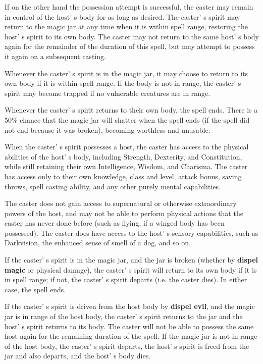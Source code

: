\documentclass[a4paper,twoside,openany,10pt]{book}
\begin{document}
\begin{multicols}{2}
If on the other hand the possession attempt is successful, the caster may remain in control of the host' s body for as long as desired. The caster' s spirit may return to the magic jar at any time when it is within spell range, restoring the host' s spirit to its own body. The caster may not return to the same host' s body again for the remainder of the duration of this spell, but may attempt to possess it again on a subsequent casting.

Whenever the caster' s spirit is in the magic jar, it may choose to return to its own body if it is within spell range. If the body is not in range, the caster' s spirit may become trapped if no vulnerable creatures are in range.

Whenever the caster' s spirit returns to their own body, the spell ends. There is a 50\% chance that the magic jar will shatter when the spell ends (if the spell did not end because it was broken), becoming worthless and unusable.

When the caster' s spirit possesses a host, the caster has access to the physical abilities of the host' s body, including Strength, Dexterity, and Constitution, while still retaining their own Intelligence, Wisdom, and Charisma. The caster has access only to their own knowledge, class and level, attack bonus, saving throws, spell casting ability, and any other purely mental capabilities.

The caster does not gain access to supernatural or otherwise extraordinary powers of the host, and may not be able to perform physical actions that the caster has never done before (such as flying, if a winged body has been possessed). The caster does have access to the host' s sensory capabilities, such as Darkvision, the enhanced sense of smell of a dog, and so on.

If the caster' s spirit is in the magic jar, and the jar is broken (whether by \textbf{dispel magic} or physical damage), the caster' s spirit will return to its own body if it is in spell range; if not, the caster' s spirit departs (i.e. the caster dies). In either case, the spell ends.

If the caster' s spirit is driven from the host body by \textbf{dispel evil}, and the magic jar is in range of the host body, the caster' s spirit returns to the jar and the host' s spirit returns to its body. The caster will not be able to possess the same host again for the remaining duration of the spell. If the magic jar is not in range of the host body, the caster' s spirit departs, the host' s spirit is freed from the jar and also departs, and the
host' s body dies. 


\end{multicols}
\end{document}
